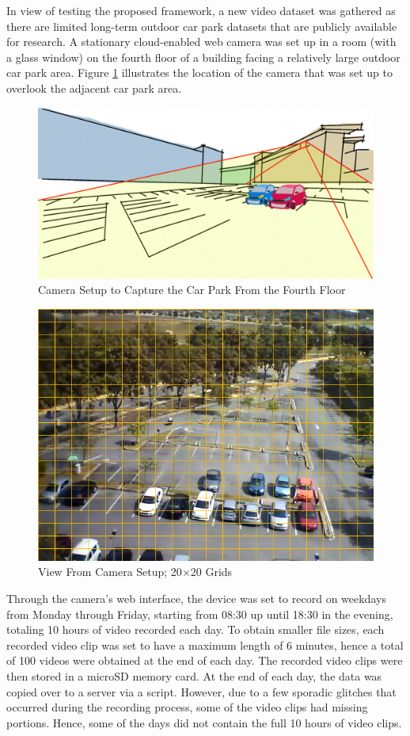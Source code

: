 In view of testing the proposed framework, a new video dataset was gathered as there are limited long-term outdoor car park datasets that are publicly available for research. A stationary cloud-enabled web camera was set up in a room (with a glass window) on the fourth floor of a building facing a relatively large outdoor car park area. Figure \ref{fig:camerasetup} illustrates the location of the camera that was set up to overlook the adjacent car park area.
\begin{figure}[hbt!]\centering
\includegraphics[width=.8\textwidth]{image/new/fcicarpark2.png}
\caption{Camera Setup to Capture the Car Park From the Fourth Floor}
\label{fig:camerasetup}
\end{figure}
\begin{figure}[!hbt]\centering
\includegraphics[width=.7\textwidth]{image/general/grids.png}
\caption{View From Camera Setup; 20$\times$20 Grids}
\label{fig:viewfromcamera}
\end{figure}

Through the camera's web interface, the device was set to record on weekdays from Monday through Friday, starting from 08:30 up until 18:30 in the evening, totaling 10 hours of video recorded each day. To obtain smaller file sizes, each recorded video clip was set to have a maximum length of 6 minutes, hence a total of 100 videos were obtained at the end of each day. The recorded video clips were then stored in a microSD memory card.
At the end of each day, the data was copied over to a server via a script. However, due to a few sporadic glitches that occurred during the recording process, some of the video clips had missing portions. Hence, some of the days did not contain the full 10 hours of video clips.

